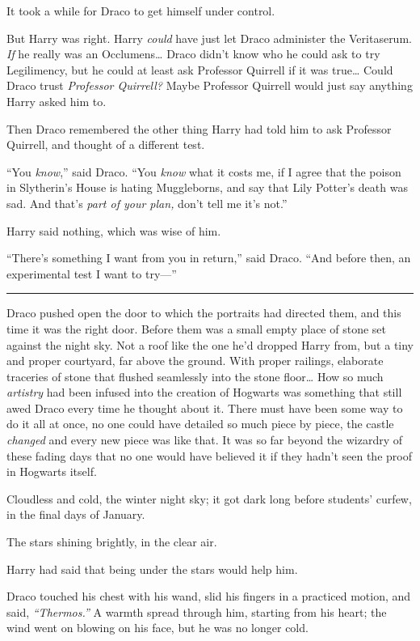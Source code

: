 It took a while for Draco to get himself under control.

But Harry was right. Harry \emph{could} have just let Draco administer
the Veritaserum. \emph{If} he really was an Occlumens\ldots{} Draco
didn't know who he could ask to try Legilimency, but he could at least
ask Professor Quirrell if it was true\ldots{} Could Draco trust
\emph{Professor Quirrell?} Maybe Professor Quirrell would just say
anything Harry asked him to.

Then Draco remembered the other thing Harry had told him to ask
Professor Quirrell, and thought of a different test.

``You \emph{know},'' said Draco. ``You \emph{know} what it costs me, if
I agree that the poison in Slytherin's House is hating Muggleborns, and
say that Lily Potter's death was sad. And that's \emph{part of your
plan,} don't tell me it's not.''

Harry said nothing, which was wise of him.

``There's something I want from you in return,'' said Draco. ``And
before then, an experimental test I want to try---''

\begin{center}\rule{3in}{0.4pt}\end{center}

Draco pushed open the door to which the portraits had directed them, and
this time it was the right door. Before them was a small empty place of
stone set against the night sky. Not a roof like the one he'd dropped
Harry from, but a tiny and proper courtyard, far above the ground. With
proper railings, elaborate traceries of stone that flushed seamlessly
into the stone floor\ldots{} How so much \emph{artistry} had been
infused into the creation of Hogwarts was something that still awed
Draco every time he thought about it. There must have been some way to
do it all at once, no one could have detailed so much piece by piece,
the castle \emph{changed} and every new piece was like that. It was so
far beyond the wizardry of these fading days that no one would have
believed it if they hadn't seen the proof in Hogwarts itself.

Cloudless and cold, the winter night sky; it got dark long before
students' curfew, in the final days of January.

The stars shining brightly, in the clear air.

Harry had said that being under the stars would help him.

Draco touched his chest with his wand, slid his fingers in a practiced
motion, and said, \emph{``Thermos.''} A warmth spread through him,
starting from his heart; the wind went on blowing on his face, but he
was no longer cold.

